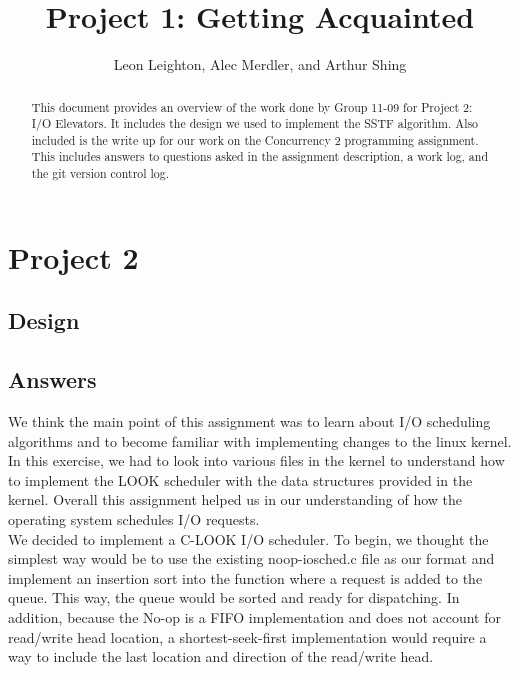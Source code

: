 \documentclass[journal, letterpaper, draftclsnofoot, onecolumn, 10pt]{IEEEtran}
\begin{document}
\title{Project 1: Getting Acquainted}
\author{Leon Leighton, Alec Merdler, and Arthur Shing}

\begin{titlepage}
    \centering
    \maketitle
    \begin{abstract}
      This document provides an overview of the work done by Group 11-09 for Project 2: I/O Elevators.
      It includes the design we used to implement the SSTF algorithm.
      Also included is the write up for our work on the Concurrency 2 programming assignment.
      This includes answers to questions asked in the assignment description, a work log, and the git version control log.
    \end{abstract}


\end{titlepage}
\tableofcontents
\clearpage

\section{Project 2}

\subsection{Design}



\subsection{Answers}


We think the main point of this assignment was to learn about I/O scheduling algorithms and to become familiar with implementing
changes to the linux kernel. In this exercise, we had to look into various files in the kernel to understand how to implement
the LOOK scheduler with the data structures provided in the kernel. Overall this assignment helped us in our understanding of
how the operating system schedules I/O requests. \\



We decided to implement a C-LOOK I/O scheduler. To begin, we thought the simplest way would be to use the existing noop-iosched.c file
as our format and implement an insertion sort into the function where a request is added to the queue. This way, the queue would be
sorted and ready for dispatching. In addition, because the No-op is a FIFO implementation and does not account for read/write head
location, a shortest-seek-first implementation would require a way to include the last location and direction of the read/write head.
 \\
\end{document}
